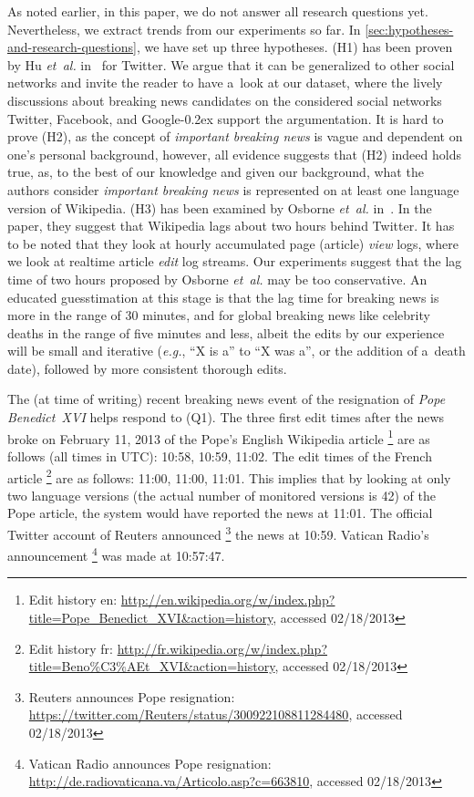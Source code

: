 \documentclass{www13-companion-accepted}
\DeclareRobustCommand{\googleplus}{\mbox{Google\hspace{0em}\raisebox{.28ex}{\tiny\bf +}\kern-0.2ex}\xspace}
\newcommand{\inlinelistingsize}{\fontsize{8pt}{11pt}}
\let\oldurl\url
\renewcommand{\url}[1]{\inlinelistingsize\oldurl{#1}}
\begin{document}
As noted earlier, in this paper,
we do not answer all research questions yet.
Nevertheless, we extract trends from our experiments so far.
In \autoref{sec:hypotheses-and-research-questions},
we have set up three hypotheses.
(H1) has been proven by Hu \emph{et~al.} in~\cite{hu2012breakingnews} for Twitter.
We argue that it can be generalized to other social networks
and invite the reader to have a~look at our dataset,
where the lively discussions about breaking news candidates
on the considered social networks Twitter, Facebook, and \googleplus
support the argumentation.
It is hard to prove (H2), as the concept of \emph{important breaking news}
is vague and dependent on one's personal background, however,
all evidence suggests that (H2) indeed holds true,
as, to the best of our knowledge and given our background,
what the authors consider \emph{important breaking news}
is represented on at least one language version of Wikipedia.
(H3) has been examined by Osborne \emph{et~al.} in~\cite{osborne2012bieber}.
In the paper, they suggest that Wikipedia lags about two hours behind Twitter.
It has to be noted that they look at hourly accumulated page (article) \emph{view} logs,
where we look at realtime article \emph{edit} log streams.
Our experiments suggest that the lag time of two hours
proposed by Osborne \emph{et~al.} may be too conservative. 
An educated guesstimation at this stage is that the lag time
for breaking news is more in the range of 30 minutes,
and for global breaking news like celebrity deaths
in the range of five minutes and less,
albeit the edits by our experience will be small and iterative
(\emph{e.g.}, ``X is a'' to ``X was a'', or the addition of a~death date),
followed by more consistent thorough edits.

The (at time of writing) recent breaking news event
of the resignation of \emph{Pope Benedict~XVI} helps respond to (Q1).
The three first edit times after the news broke on February 11, 2013
of the Pope's English Wikipedia article%
\footnote{Edit history en: \url{http://en.wikipedia.org/w/index.php?title=Pope_Benedict_XVI&action=history},
accessed 02/18/2013} 
are as follows
(all times in UTC): 10:58, 10:59, 11:02.
The edit times of the French article%
\footnote{Edit history fr: \url{http://fr.wikipedia.org/w/index.php?title=Beno\%C3\%AEt_XVI&action=history}, accessed 02/18/2013}
are as follows: 11:00, 11:00, 11:01.
This implies that by looking at only two language versions
(the actual number of monitored versions is 42) of the Pope article,
the system would have reported the news at 11:01.
The official Twitter account of Reuters announced%
\footnote{Reuters announces Pope resignation: \url{https://twitter.com/Reuters/status/300922108811284480},
accessed 02/18/2013} the news at 10:59.
Vatican Radio's announcement%
\footnote{Vatican Radio announces Pope resignation: \url{http://de.radiovaticana.va/Articolo.asp?c=663810},
accessed 02/18/2013} was made at 10:57:47.
\end{document}
